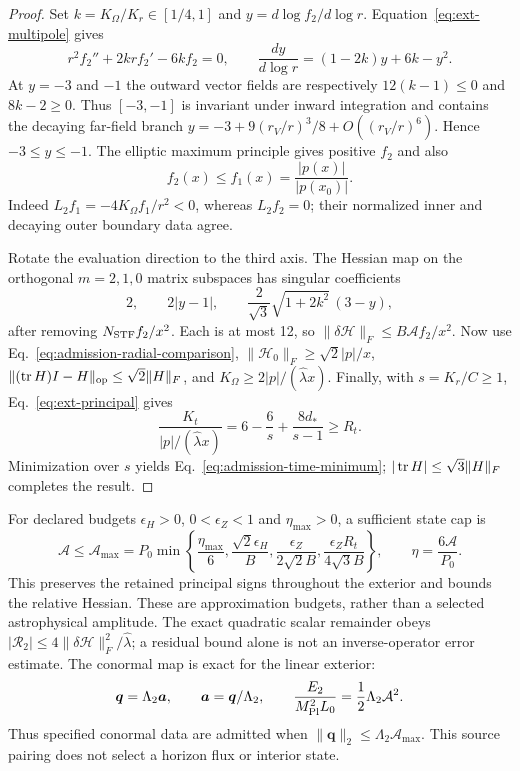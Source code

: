 \begin{proof}
Set $k=K_\Omega/K_r\in[1/4,1]$ and
$y=d\log f_2/d\log r$. Equation~\eqref{eq:ext-multipole} gives
\begin{equation}
 r^2f_2''+2krf_2'-6kf_2=0,\qquad
 \frac{dy}{d\log r}=(1-2k)y+6k-y^2.
\end{equation}
At $y=-3$ and $-1$ the outward vector fields are respectively
$12(k-1)\le0$ and $8k-2\ge0$. Thus $[-3,-1]$ is invariant under
inward integration and contains the decaying far-field branch
$y=-3+9(r_V/r)^3/8+O((r_V/r)^6)$. Hence $-3\le y\le-1$.
The elliptic maximum principle gives positive $f_2$ and also
\begin{equation}
 f_2(x)\le f_1(x)=\frac{|p(x)|}{|p(x_0)|}.
 \label{eq:admission-radial-comparison}
\end{equation}
Indeed $L_2f_1=-4K_\Omega f_1/r^2<0$, whereas $L_2f_2=0$;
their normalized inner and decaying outer boundary data agree.

Rotate the evaluation direction to the third axis. The Hessian map on
the orthogonal $m=2,1,0$ matrix subspaces has singular coefficients
\begin{equation}
 2,\qquad 2|y-1|,\qquad
 \frac2{\sqrt3}\sqrt{1+2k^2}\,(3-y),
\end{equation}
after removing $N_{\rm STF}f_2/x^2$. Each is at most 12, so
$\|\delta\mathcal H\|_F\le B\mathcal A f_2/x^2$.
Now use Eq.~\eqref{eq:admission-radial-comparison},
$\|\mathcal H_0\|_F\ge\sqrt2|p|/x$,
$\|(\operatorname{tr} H)I-H\|_{\rm op}\le\sqrt2\|H\|_F$, and
$K_\Omega\ge2|p|/(\widehat\lambda x)$.
Finally, with $s=K_r/C\ge1$, Eq.~\eqref{eq:ext-principal} gives
\begin{equation}
 \frac{K_t}{|p|/(\widehat\lambda x)}
 =6-\frac6s+\frac{8d_*}{s-1}\ge R_t.
\end{equation}
Minimization over $s$ yields Eq.~\eqref{eq:admission-time-minimum};
$|\operatorname{tr} H|\le\sqrt3\|H\|_F$ completes the result.
\end{proof}

For declared budgets $\epsilon_H>0$, $0<\epsilon_Z<1$ and
$\eta_{\max}>0$, a sufficient state cap is
\begin{equation}
 \mathcal A\le\mathcal A_{\max}=P_0\min\left\{
 \frac{\eta_{\max}}6,\frac{\sqrt2\epsilon_H}B,
 \frac{\epsilon_Z}{2\sqrt2B},
 \frac{\epsilon_ZR_t}{4\sqrt3B}\right\},\qquad
 \eta=\frac{6\mathcal A}{P_0}.
 \label{eq:admission-cap}
\end{equation}
This preserves the retained principal signs throughout the exterior and
bounds the relative Hessian. These are approximation budgets, rather than
a selected astrophysical amplitude. The exact quadratic scalar remainder
obeys $|\mathcal R_2|\le4\|\delta\mathcal H\|_F^2/
\widehat\lambda$; a residual bound alone is not an inverse-operator error
estimate. The conormal map is exact for the linear exterior:
\begin{equation}
 \boldsymbol q=\Lambda_2\boldsymbol a,\qquad
 \boldsymbol a=\boldsymbol q/\Lambda_2,\qquad
 \frac{E_2}{M_{\rm Pl}^2L_0}=\frac12\Lambda_2\mathcal A^2.
 \label{eq:admission-conormal}
\end{equation}
Thus specified conormal data are admitted when
$\|\boldsymbol q\|_2\le\Lambda_2\mathcal A_{\max}$.
This source pairing does not select a horizon flux or interior state.

